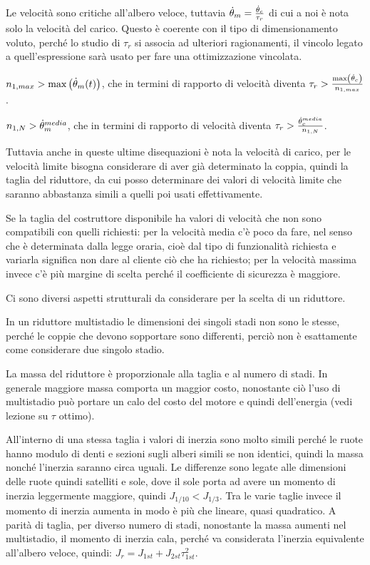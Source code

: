 Le velocità sono critiche all'albero veloce, tuttavia $\dot{\theta}_m=\frac{\dot{\theta}_c}{\tau_r}$ di cui a noi è nota solo la velocità del carico. Questo è coerente con il tipo di dimensionamento voluto, perché lo studio di $\tau_r$ si associa ad ulteriori ragionamenti, il vincolo legato a quell'espressione sarà usato per fare una ottimizzazione vincolata.

$n_{1,max}>\textup{max}\left(\dot{\theta}_m(t)\right)$, che in termini di rapporto di velocità diventa $\tau_r>\frac{\textup{max}\left(\dot{\theta}_c\right)}{n_{1,max}}$.

$n_{1,N}>\dot{\theta}_m^{media}$, che in termini di rapporto di velocità diventa $\tau_r > \frac{\dot{\theta}_c^{media}}{n_{1,N}}$.

Tuttavia anche in queste ultime disequazioni è nota la velocità di carico, per le velocità limite bisogna considerare di aver già determinato la coppia, quindi la taglia del riduttore, da cui posso determinare dei valori di velocità limite che saranno abbastanza simili a quelli poi usati effettivamente.

Se la taglia del costruttore disponibile ha valori di velocità che non sono compatibili con quelli richiesti: per la velocità media c'è poco da fare, nel senso che è determinata dalla legge oraria, cioè dal tipo di funzionalità richiesta e variarla significa non dare al cliente ciò che ha richiesto; per la velocità massima invece c'è più margine di scelta perché il coefficiente di sicurezza è maggiore.

Ci sono diversi aspetti strutturali da considerare per la scelta di un riduttore.

In un riduttore multistadio le dimensioni dei singoli stadi non sono le stesse, perché le coppie che devono sopportare sono differenti, perciò non è esattamente come considerare due singolo stadio.

La massa del riduttore è proporzionale alla taglia e al numero di stadi. 
In generale maggiore massa comporta un maggior costo, nonostante ciò l'uso di multistadio può portare un calo del costo del motore e quindi dell'energia (vedi lezione su $\tau$ ottimo).

All'interno di una stessa taglia i valori di inerzia sono molto simili perché le ruote hanno modulo di denti e sezioni sugli alberi simili se non identici, quindi la massa nonché l'inerzia saranno circa uguali.
Le differenze sono legate alle dimensioni delle ruote quindi satelliti e sole, dove il sole porta ad avere un momento di inerzia leggermente maggiore, quindi $J_{1/10}<J_{1/3}$.
Tra le varie taglie invece il momento di inerzia aumenta in modo è più che lineare, quasi quadratico.
A parità di taglia, per diverso numero di stadi, nonostante la massa aumenti nel multistadio, il momento di inerzia cala, perché va considerata l'inerzia equivalente all'albero veloce, quindi: $J_r=J_{1st}+J_{2st}\tau_{1st}^2$.

